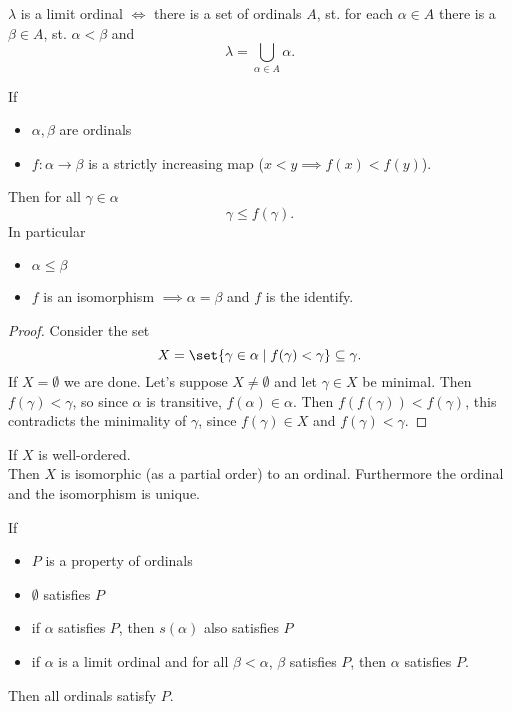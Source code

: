 \begin{exercise}
    $\lambda$ is a limit ordinal $\iff$ there is a set of ordinals $A$, 
    st. for each $\alpha \in A$ there is a $\beta \in A$, st. $\alpha < \beta$ and 
    $$ \lambda = \bigcup_{\alpha \in A} \alpha.$$
\end{exercise}

\newpage
\begin{lemma}\label{lemma:1}
    If 
    \begin{itemize}
        \item $\alpha, \beta$ are ordinals
        \item $f: \alpha \to \beta$ is a strictly increasing map ($x<y \implies f(x) < f(y)$).
    \end{itemize}
    Then for all $\gamma \in \alpha$
    $$ \gamma \leq f(\gamma).$$
    In particular 
    \begin{itemize}
        \item $\alpha \leq \beta$
        \item $f$ is an isomorphism $ \implies \alpha = \beta$ and $f$ is the identify.
    \end{itemize}
\end{lemma}
\begin{proof}
    Consider the set
    $$ X = \set{\gamma \in \alpha \mid f(\gamma) < \gamma} \subseteq \gamma.$$
    If $X = \emptyset$ we are done. Let's suppose $X \ne \emptyset$ and let $\gamma \in X$ be minimal.
    Then $f(\gamma) < \gamma$, so since $\alpha$ is transitive, $f(\alpha) \in \alpha$.
    Then $f(f(\gamma)) < f(\gamma)$, this contradicts the minimality of $\gamma$, since $f(\gamma) \in X$ and $f(\gamma) < \gamma$.    
\end{proof}

\begin{theorem}\label{thm:1}
    If $X$ is well-ordered.\\
    Then $X$ is isomorphic (as a partial order) to an ordinal. Furthermore the ordinal and the isomorphism is unique.
\end{theorem}

\begin{theorem}
    If
    \begin{itemize}
        \item $P$ is a property of ordinals
        \item $\emptyset$ satisfies $P$
        \item if $\alpha$ satisfies $P$, then $s(\alpha)$ also satisfies $P$
        \item if $\alpha$ is a limit ordinal and for all $\beta < \alpha$, $\beta$ satisfies $P$, then
        $\alpha$ satisfies $P$.
    \end{itemize}
    Then all ordinals satisfy $P$.
\end{theorem}

